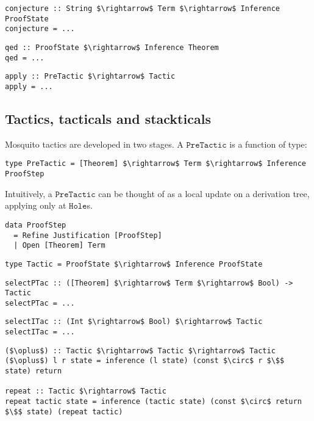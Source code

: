 \documentclass{llncs}
\newcommand{\mosquito}{Mosquito\xspace}
\begin{document}
\begin{lstlisting}
conjecture :: String $\rightarrow$ Term $\rightarrow$ Inference ProofState
conjecture = ...
\end{lstlisting}

\begin{lstlisting}
qed :: ProofState $\rightarrow$ Inference Theorem
qed = ...
\end{lstlisting}

\begin{lstlisting}
apply :: PreTactic $\rightarrow$ Tactic
apply = ...
\end{lstlisting}

\subsection{Tactics, tacticals and stackticals}
\label{subsect.tactics.tacticals.modifying.proof.state}

\mosquito tactics are developed in two stages.
A $\mathtt{PreTactic}$ is a function of type:
\begin{lstlisting}
type PreTactic = [Theorem] $\rightarrow$ Term $\rightarrow$ Inference ProofStep
\end{lstlisting}
Intuitively, a $\mathtt{PreTactic}$ can be thought of as a local update on a derivation tree, applying only at $\mathtt{Hole}$s.

\begin{lstlisting}
data ProofStep
  = Refine Justification [ProofStep]
  | Open [Theorem] Term
\end{lstlisting}

\begin{lstlisting}
type Tactic = ProofState $\rightarrow$ Inference ProofState
\end{lstlisting}

\begin{lstlisting}
selectPTac :: ([Theorem] $\rightarrow$ Term $\rightarrow$ Bool) -> Tactic
selectPTac = ...
\end{lstlisting}

\begin{lstlisting}
selectITac :: (Int $\rightarrow$ Bool) $\rightarrow$ Tactic
selectITac = ...
\end{lstlisting}

\begin{lstlisting}
($\oplus$) :: Tactic $\rightarrow$ Tactic $\rightarrow$ Tactic
($\oplus$) l r state = inference (l state) (const $\circ$ r $\$$ state) return

repeat :: Tactic $\rightarrow$ Tactic
repeat tactic state = inference (tactic state) (const $\circ$ return $\$$ state) (repeat tactic)
\end{lstlisting}
\end{document}
